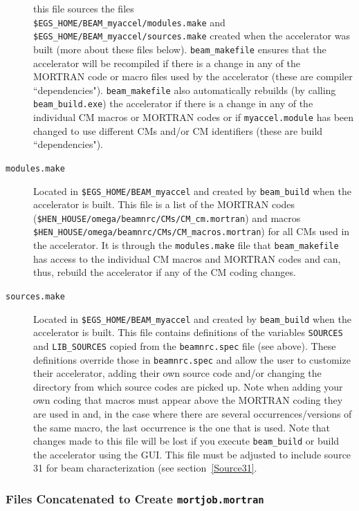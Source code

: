 \documentclass[12pt,twoside]{article}
\begin{document}
\begin{description}
this file sources the files\\ {\tt \$EGS\_HOME/BEAM\_myaccel/modules.make}
and {\tt \$EGS\_HOME/BEAM\_myaccel/sources.make} created when the accelerator
was built (more about these files below).  {\tt beam\_makefile} ensures
that the accelerator will be recompiled if there is a change in any of
the MORTRAN code or macro files used by the accelerator (these are
compiler ``dependencies").  {\tt beam\_makefile} also automatically rebuilds
(by calling {\tt beam\_build.exe}) the accelerator if there is a change
in any of the individual CM macros or MORTRAN codes or if {\tt myaccel.module}
has been changed to use different CMs and/or CM identifiers (these
are build ``dependencies").
\item[{\tt modules.make}] Located in {\tt \$EGS\_HOME/BEAM\_myaccel} and
created by {\tt beam\_build} when the accelerator is built.  This file
is a list of the MORTRAN codes\\
({\tt \$HEN\_HOUSE/omega/beamnrc/CMs/CM\_cm.mortran}) and macros\\
{\tt \$HEN\_HOUSE/omega/beamnrc/CMs/CM\_macros.mortran}) for all CMs used in
the accelerator.  It is through the {\tt modules.make} file that
{\tt beam\_makefile} has access to the individual CM macros and MORTRAN codes
and can, thus, rebuild the accelerator if any of the CM coding changes.
\item[{\tt sources.make}] Located in {\tt \$EGS\_HOME/BEAM\_myaccel} and
created by {\tt beam\_build} when the accelerator is built.  This file
contains definitions of the variables {\tt SOURCES} and
{\tt LIB\_SOURCES} copied from the {\tt beamnrc.spec} file (see above).
These definitions override those in {\tt beamnrc.spec} and allow the user
to customize their accelerator, adding their own source code and/or changing the
directory from which source codes are picked up.
Note when adding your own coding that macros must appear above
the MORTRAN coding they are used in and, in the case where there are several
occurrences/versions of the same macro, the last occurrence is the one
that is used. Note that changes made to this file will be lost if you
execute {\tt beam\_build} or build the accelerator using the GUI. This file
must be adjusted to include source 31 for beam characterization (see
section~\ref{Source31}.
\end{description}

\subsubsection{Files Concatenated to Create {\tt mortjob.mortran}}
\label{mortjobsect}
\end{document}
